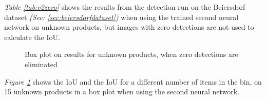 \textit{Table \ref{tab:v2zero}} shows the results from the detection run on the Beiersdorf dataset \textit{(Sec: \ref{sec:beiersdorfdataset})} when using the trained second neural network on unknown products, but images with zero detections are not used to calculate the IoU. %

\begin{figure}[h]
    \centering
    \hfill
    
    \caption{Box plot on results for unknown products, when zero detections are eliminated}
    \label{fig:v2zerofig}
\end{figure}

\textit{Figure \ref{fig:v2zerofig}} shows the IoU and the IoU for a different number of items in the bin, on 15 unknown products in a box plot when using the second neural network.


\clearpage
